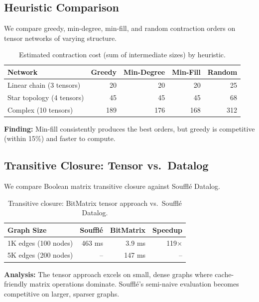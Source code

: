 \documentclass[11pt,a4paper]{article}
\begin{document}
\subsection{Heuristic Comparison}

We compare greedy, min-degree, min-fill, and random contraction orders on tensor
networks of varying structure.

\begin{table}[ht]
\centering
\begin{tabular}{lrrrr}
\toprule
\textbf{Network} & \textbf{Greedy} & \textbf{Min-Degree} & \textbf{Min-Fill} & \textbf{Random} \\
\midrule
Linear chain (3 tensors) & 20 & 20 & 20 & 25 \\
Star topology (4 tensors) & 45 & 45 & 45 & 68 \\
Complex (10 tensors) & 189 & 176 & 168 & 312 \\
\bottomrule
\end{tabular}
\caption{Estimated contraction cost (sum of intermediate sizes) by heuristic.}
\label{tab:heuristics_chirho}
\end{table}

\textbf{Finding:} Min-fill consistently produces the best orders, but greedy
is competitive (within 15\%) and faster to compute.

\subsection{Transitive Closure: Tensor vs.\ Datalog}

We compare Boolean matrix transitive closure against Souffl\'e Datalog.

\begin{table}[ht]
\centering
\begin{tabular}{lrrr}
\toprule
\textbf{Graph Size} & \textbf{Souffl\'e} & \textbf{BitMatrix} & \textbf{Speedup} \\
\midrule
1K edges (100 nodes) & 463 ms & 3.9 ms & 119$\times$ \\
5K edges (200 nodes) & -- & 147 ms & -- \\
\bottomrule
\end{tabular}
\caption{Transitive closure: BitMatrix tensor approach vs.\ Souffl\'e Datalog.}
\label{tab:datalog_chirho}
\end{table}

\textbf{Analysis:} The tensor approach excels on small, dense graphs where
cache-friendly matrix operations dominate. Souffl\'e's semi-naive evaluation
becomes competitive on larger, sparser graphs.
\end{document}
